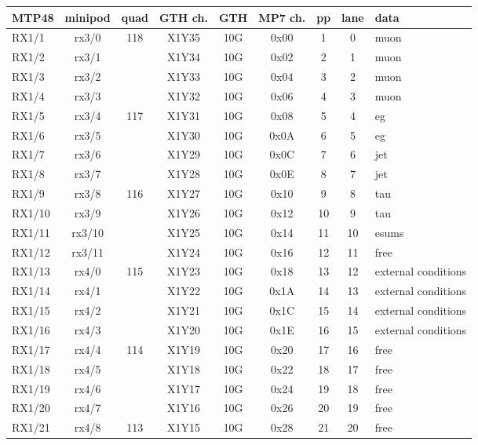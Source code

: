 \begin{longtable}{|l|c|c|c|c|c|c|c|l|}
\hline
\textbf{MTP48}& \textbf{minipod}& \textbf{quad}& \textbf{GTH ch.}& \textbf{GTH}& \textbf{MP7 ch.} &\textbf{pp}& \textbf{lane}& \textbf{data}\\
\hline
\hline
\endhead
RX1/1  & rx3/0  & 118 & X1Y35 & 10G & 0x00 & 1  & 0  & muon\\\hline
RX1/2  & rx3/1  &     & X1Y34 & 10G & 0x02 & 2  & 1  & muon\\\hline
RX1/3  & rx3/2  &     & X1Y33 & 10G & 0x04 & 3  & 2  & muon\\\hline
RX1/4  & rx3/3  &     & X1Y32 & 10G & 0x06 & 4  & 3  & muon\\\hline
RX1/5  & rx3/4  & 117 & X1Y31 & 10G & 0x08 & 5  & 4  & eg\\\hline
RX1/6  & rx3/5  &     & X1Y30 & 10G & 0x0A & 6  & 5  & eg\\\hline
RX1/7  & rx3/6  &     & X1Y29 & 10G & 0x0C & 7  & 6  & jet\\\hline
RX1/8  & rx3/7  &     & X1Y28 & 10G & 0x0E & 8  & 7  & jet\\\hline
RX1/9  & rx3/8  & 116 & X1Y27 & 10G & 0x10 & 9  & 8  & tau\\\hline
RX1/10 & rx3/9  &     & X1Y26 & 10G & 0x12 & 10 & 9  & tau\\\hline
RX1/11 & rx3/10 &     & X1Y25 & 10G & 0x14 & 11 & 10 & esums\\\hline
RX1/12 & rx3/11 &     & X1Y24 & 10G & 0x16 & 12 & 11 & free\\\hline
RX1/13 & rx4/0  & 115 & X1Y23 & 10G & 0x18 & 13 & 12 & external conditions\\\hline
RX1/14 & rx4/1  &     & X1Y22 & 10G & 0x1A & 14 & 13 & external conditions\\\hline
RX1/15 & rx4/2  &     & X1Y21 & 10G & 0x1C & 15 & 14 & external conditions\\\hline
RX1/16 & rx4/3  &     & X1Y20 & 10G & 0x1E & 16 & 15 & external conditions\\\hline
RX1/17 & rx4/4  & 114 & X1Y19 & 10G & 0x20 & 17 & 16 & free\\\hline
RX1/18 & rx4/5  &     & X1Y18 & 10G & 0x22 & 18 & 17 & free\\\hline
RX1/19 & rx4/6  &     & X1Y17 & 10G & 0x24 & 19 & 18 & free\\\hline
RX1/20 & rx4/7  &     & X1Y16 & 10G & 0x26 & 20 & 19 & free\\\hline
RX1/21 & rx4/8  & 113 & X1Y15 & 10G & 0x28 & 21 & 20 & free\\\hline

\end{longtable}
